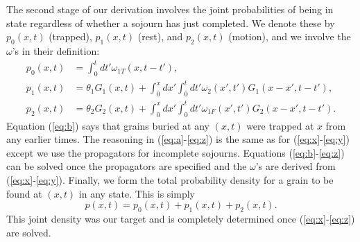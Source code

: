 \documentclass[draft,grl]{agujournal2018}
\newcommand\be{\begin{equation}}
\newcommand\ee{\end{equation}}
\begin{document}
The second stage of our derivation involves the joint probabilities of being in state regardless of whether a sojourn has just completed. We denote these by  $p_0(x,t)$ (trapped), $p_1(x,t)$ (rest), and $p_2(x,t)$ (motion), and we involve the $\omega$'s in their definition:
\begin{align}
p_0(x,t) &= \int_0^t dt' \omega_{1T}(x,t-t'), \label{eq:b}\\
p_1(x,t) &= \theta_1 G_1(x,t) + \int_0^x dx' \int_0^t dt' \omega_2(x',t')G_1(x-x',t-t'),\label{eq:a}\\
p_2(x,t) &= \theta_2 G_2(x,t) + \int_0^x dx' \int_0^t dt'  \omega_{1F}(x',t')G_2(x-x',t-t').\label{eq:z}
\end{align}
Equation (\ref{eq:b}) says that grains buried at any $(x,t)$ were trapped at $x$ from any earlier times.
The reasoning in (\ref{eq:a}-\ref{eq:z}) is the same as for (\ref{eq:x}-\ref{eq:y}) except we use the propagators for incomplete sojourns.
Equations (\ref{eq:b}-\ref{eq:z}) can be solved once the propagators are specified and the $\omega$'s are derived from (\ref{eq:x}-\ref{eq:y}).
Finally, we form the total probability density for a grain to be found at $(x,t)$ in any state.
This is simply 
\be p(x,t) = p_0(x,t) + p_1(x,t) + p_2(x,t). \label{eq:dist}\ee
This joint density was our target and is completely determined once (\ref{eq:x}-\ref{eq:z}) are solved.
\end{document}
